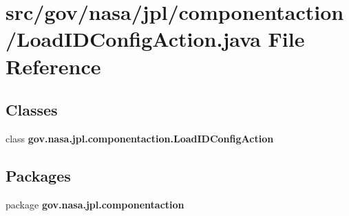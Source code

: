 \section{src/gov/nasa/jpl/componentaction/\+Load\+I\+D\+Config\+Action.java File Reference}
\label{_load_i_d_config_action_8java}
\subsection*{Classes}
\begin{DoxyCompactItemize}
\item 
class {\bf gov.\+nasa.\+jpl.\+componentaction.\+Load\+I\+D\+Config\+Action}
\end{DoxyCompactItemize}
\subsection*{Packages}
\begin{DoxyCompactItemize}
\item 
package {\bf gov.\+nasa.\+jpl.\+componentaction}
\end{DoxyCompactItemize}
